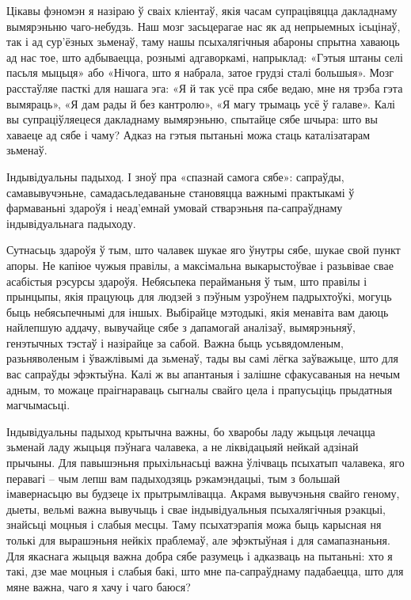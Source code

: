 Цікавы фэномэн я назіраю ў сваіх кліентаў, якія часам супрацівяцца дакладнаму вымярэньню чаго-небудзь. Наш мозг засьцерагае нас як ад непрыемных ісьцінаў, так і ад сур'ёзных зьменаў, таму нашы псыхалягічныя абароны спрытна хаваюць ад нас тое, што адбываецца, рознымі адгаворкамі, напрыклад: «Гэтыя штаны селі пасьля мыцьця» або «Нічога, што я набрала, затое грудзі сталі большыя». Мозг расстаўляе пасткі для нашага эга: «Я й так усё пра сябе ведаю, мне ня трэба гэта вымяраць», «Я дам рады й без кантролю», «Я магу трымаць усё ў галаве». Калі вы супраціўляецеся дакладнаму вымярэньню, спытайце сябе шчыра: што вы хаваеце ад сябе і чаму? Адказ на гэтыя пытаньні можа стаць каталізатарам зьменаў.

Індывідуальны падыход. І зноў пра «спазнай самога сябе»: сапраўды, самавывучэньне, самадасьледаваньне становяцца важнымі практыкамі ў фармаваньні здароўя і неад'емнай умовай стварэньня па-сапраўднаму індывідуальнага падыходу.

Сутнасьць здароўя ў тым, што чалавек шукае яго ўнутры сябе, шукае свой пункт апоры. Не капіюе чужыя правілы, а максімальна выкарыстоўвае і разьвівае свае асабістыя рэсурсы здароўя. Небясьпека перайманьня ў тым, што правілы і прынцыпы, якія працуюць для людзей з пэўным узроўнем падрыхтоўкі, могуць быць небясьпечнымі для іншых. Выбірайце мэтодыкі, якія менавіта вам даюць найлепшую аддачу, вывучайце сябе з дапамогай аналізаў, вымярэньняў, генэтычных тэстаў і назірайце за сабой. Важна быць усьвядомленым, разьняволеным і ўважлівымі да зьменаў, тады вы самі лёгка заўважыце, што для вас сапраўды эфэктыўна. Калі ж вы апантаныя і залішне сфакусаваныя на нечым адным, то можаце праігнараваць сыгналы свайго цела і прапусьціць прыдатныя магчымасьці.

Індывідуальны падыход крытычна важны, бо хваробы ладу жыцьця лечацца зьменай ладу жыцьця пэўнага чалавека, а не ліквідацыяй нейкай адзінай прычыны. Для павышэньня прыхільнасьці важна ўлічваць псыхатып чалавека, яго перавагі – чым лепш вам падыходзяць рэкамэндацыі, тым з большай імавернасьцю вы будзеце іх прытрымлівацца. Акрамя вывучэньня свайго геному, дыеты, вельмі важна вывучыць і свае індывідуальныя псыхалягічныя рэакцыі, знайсьці моцныя і слабыя месцы. Таму псыхатэрапія можа быць карысная ня толькі для вырашэньня нейкіх праблемаў, але эфэктыўная і для самапазнаньня. Для якаснага жыцьця важна добра сябе разумець і адказваць на пытаньні: хто я такі, дзе мае моцныя і слабыя бакі, што мне па-сапраўднаму падабаецца, што для мяне важна, чаго я хачу і чаго баюся?

